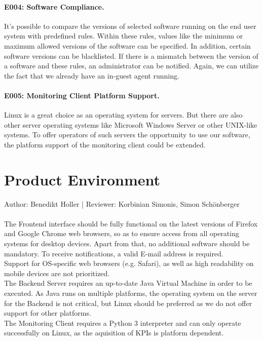 \documentclass{scrreprt}
\begin{document}
\paragraph{E004: Software Compliance.}
It's possible to compare the versions of selected software running on the end user system with predefined rules. Within these rules, values like the minimum or maximum allowed versions of the software can be specified. In addition, certain software versions can be blacklisted. If there is a mismatch between the version of a software and these rules, an administrator can be notified.
Again, we can utilize the fact that we already have an in-guest agent running.

\paragraph{E005: Monitoring Client Platform Support.} Linux is a great choice as an operating system for servers. But there are also other server operating systems like Microsoft Windows Server or other UNIX-like systems. To offer operators of such servers the opportunity to use our software, the platform support of the monitoring client could be extended.

\section{Product Environment}
Author: Benedikt Holler |
Reviewer: Korbinian Simonis, Simon Sch\"onberger\\ \\
The Frontend interface should be fully functional on the latest versions of Firefox and Google Chrome web browsers, so as to ensure access from all operating systems for desktop devices. Apart from that, no additional software should be mandatory. To receive notifications, a valid E-mail address is required. \\
Support for OS-specific web browsers (e.g. Safari), as well as high readability on mobile devices are not prioritized. \\
The Backend Server requires an up-to-date Java Virtual Machine in order to be executed. As Java runs on multiple platforms, the operating system on the server for the Backend is not critical, but Linux should be preferred as we do not offer support for other platforms. \\
The Monitoring Client requires a Python 3 interpreter and can only operate successfully on Linux, as the aquisition of KPIs is platform dependent.
\end{document}
